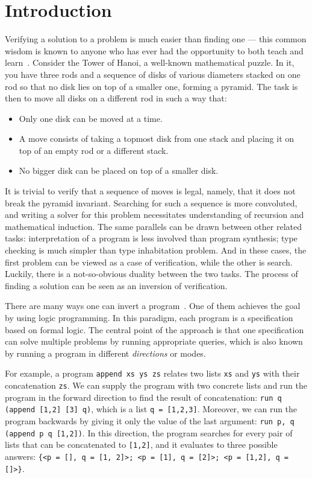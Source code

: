 \section{Introduction}

Verifying a solution to a problem is much easier than finding one --- this common wisdom is known to anyone who has ever had the opportunity to both teach and learn~\cite{lozov2019relational}. 
Consider the Tower of Hanoi, a well-known mathematical puzzle. 
In it, you have three rods and a sequence of disks of various diameters stacked on one rod so that no disk lies on top of a smaller one, forming a pyramid.
The task is then to move all disks on a different rod in such a way that: 
\begin{itemize}
    \item Only one disk can be moved at a time.
    \item A move consists of taking a topmost disk from one stack and placing it on top of an empty rod or a different stack.
    \item No bigger disk can be placed on top of a smaller disk. 
\end{itemize}

It is trivial to verify that a sequence of moves is legal, namely, that it does not break the pyramid invariant. 
Searching for such a sequence is more convoluted, and writing a solver for this problem necessitates understanding of recursion and mathematical induction. 
The same parallels can be drawn between other related tasks: interpretation of a program  is less involved than program synthesis; type checking is much simpler than type inhabitation problem.  
And in these cases, the first problem can be viewed as a case of verification, while the other is search. 
Luckily, there is a not-so-obvious duality between the two tasks.
The process of finding a solution can be seen as an inversion of verification.

There are many ways one can invert a program~\cite{SemanticsModifiers1,RevURA,aman2020foundations}. 
One of them achieves the goal by using logic programming. 
In this paradigm, each program is a specification based on formal logic. 
The central point of the approach is that one specification can solve multiple problems by running appropriate queries, which is also known by running a program in different \emph{directions} or modes. 

For example, a program \texttt{append xs ys zs} relates two lists \texttt{xs} and \texttt{ys} with their concatenation \texttt{zs}. 
We can supply the program with two concrete lists and run the program in the forward direction to find the result of concatenation: \texttt{run q (append [1,2] [3] q)}, which is a list \texttt{q = [1,2,3]}. 
Moreover, we can run the program backwards by giving it only the value of the last argument: \texttt{run p, q (append p q [1,2])}.
In this direction, the program searches for every pair of lists that can be concatenated to \texttt{[1,2]}, and it evaluates to three possible answers: \texttt{\{<p = [], q = [1, 2]>; <p = [1], q = [2]>; <p = [1,2], q = []>\}}. 

